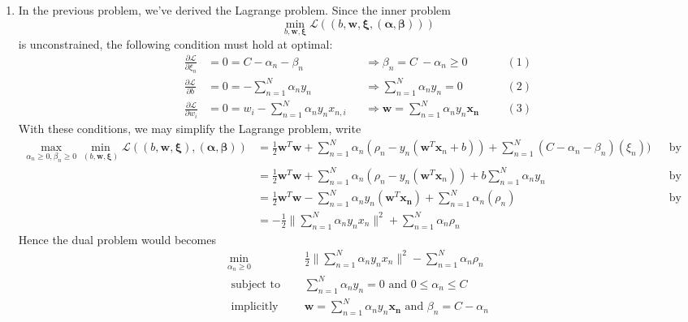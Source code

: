 \documentclass{article}
\begin{document}
\begin{CJK*}{UTF8}{bsmi}
\begin{normalsize}
\begin{enumerate}[label=\textbf{\arabic*}.]
        \item In the previous problem, we've derived the Lagrange problem. Since the inner problem
        \[ \min_{b, \mathbf{w}, \mathbf{\xi}} \mathcal{L}((b,\mathbf{w},\mathbf{\xi}, (\mathbf{\alpha}, \mathbf{\beta}))) \]
        is unconstrained, the following condition must hold at optimal:
        \[ \begin{aligned} 
        \frac{\partial \mathcal{L}}{\partial \xi_n} &= 0 = C-\alpha_n-\beta_n && \Rightarrow \beta_n = C\ - \alpha_n \ge 0 &&&(1)\\
        \frac{\partial \mathcal{L}}{\partial b} &= 0 = -\sum_{n=1}^N \alpha_n y_n &&\Rightarrow \sum_{n=1}^N \alpha_n y_n = 0 &&&(2)\\
        \frac{\partial \mathcal{L}}{\partial w_i} &= 0 = w_i - \sum_{n=1}^N \alpha_n y_n x_{n,i} &&\Rightarrow \mathbf{w} = \sum_{n=1}^N \alpha_n y_n \mathbf{x_n} &&&(3)
        \end{aligned}\]
        With these conditions, we may simplify the Lagrange problem, write
        \[ \begin{aligned} \max_{\alpha_n \ge 0, \beta_n \ge 0} \min_{(b, \mathbf{w}, \mathbf{\xi})}\mathcal{L}((b, \mathbf{w}, \mathbf{\xi}),(\mathbf{\alpha}, \mathbf{\beta}))
        &= \frac{1}{2}\mathbf{w}^T\mathbf{w} + \sum_{n=1}^N \alpha_n(\rho_n-y_n(\mathbf{w}^T\mathbf{x}_n+b)) + \sum_{n=1}^N (C-\alpha_n-\beta_n) (\xi_n)) &&\text{by (1)}\\
        &= \frac{1}{2}\mathbf{w}^T\mathbf{w} + \sum_{n=1}^N \alpha_n(\rho_n-y_n(\mathbf{w}^T\mathbf{x}_n)) + b\sum_{n=1}^N \alpha_n y_n &&\text{by (2)}\\
        &= \frac{1}{2}\mathbf{w}^T\mathbf{w} - \sum_{n=1}^N \alpha_n y_n(\mathbf{w}^T\mathbf{x_n}) + \sum_{n=1}^N \alpha_n(\rho_n) &&\text{by (3)}\\
        &= -\frac{1}{2}\|\sum_{n=1}^N \alpha_n y_n x_n\|^2 + \sum_{n=1}^N \alpha_n \rho_n \end{aligned} \]
        Hence the dual problem would becomes
        \[ \begin{aligned} \min_{\alpha_n \ge 0}\enspace \enspace& \frac{1}{2}\|\sum_{n=1}^N \alpha_n y_n x_n\|^2 - \sum_{n=1}^N \alpha_n \rho_n\\
        \text{ subject to }\enspace \enspace& \sum_{n=1}^N \alpha_n y_n = 0 \text{ and }0\le\alpha_n \le C\\
        \text{ implicitly }\enspace \enspace& \mathbf{w} = \sum_{n=1}^N \alpha_n y_n \mathbf{x_n} \text{ and } \beta_n = C-\alpha_n
        \end{aligned} \]
        

\end{enumerate}
\end{normalsize}
\end{CJK*}
\end{document}

